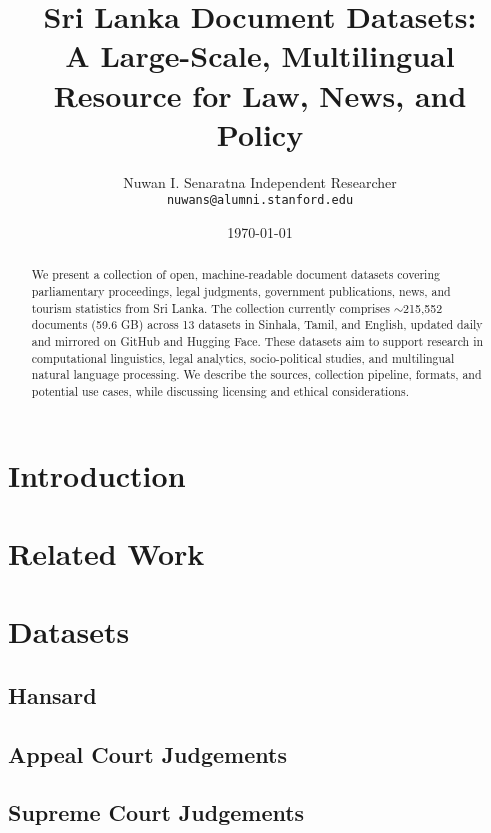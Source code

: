 \documentclass[11pt]{article}
\title{%
Sri Lanka Document Datasets: \\
A Large-Scale, Multilingual Resource for Law, News, and Policy
}
\author{Nuwan I. Senaratna \small{Independent Researcher} \\
\texttt{nuwans@alumni.stanford.edu}
}
\date{\today}
\begin{document}
\maketitle


\begin{abstract}

We present a collection of open, machine-readable document datasets covering
parliamentary proceedings, legal judgments, government publications, news, and
tourism statistics from Sri Lanka. The collection currently comprises
$\sim$215,552 documents (59.6 GB)
across 13 datasets in Sinhala, Tamil, and
English, updated daily and mirrored on GitHub and Hugging Face. These datasets
aim to support research in computational linguistics, legal analytics,
socio-political studies, and multilingual natural language processing. We
describe the sources, collection pipeline, formats, and potential use cases,
while discussing licensing and ethical considerations.

\end{abstract}
            

\section{Introduction}

\section{Related Work}


\section{Datasets}

\subsection{Hansard}



\subsection{Appeal Court Judgements}



\subsection{Supreme Court Judgements}
\end{document}
